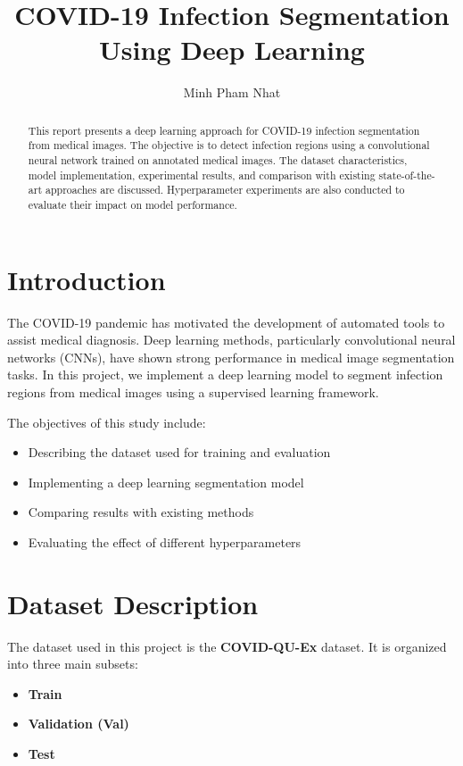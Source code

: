 \documentclass[10pt,twocolumn]{article}
\title{COVID-19 Infection Segmentation Using Deep Learning}
\author{Minh Pham Nhat}
\begin{document}
\maketitle

\begin{abstract}
This report presents a deep learning approach for COVID-19 infection segmentation from medical images. 
The objective is to detect infection regions using a convolutional neural network trained on annotated 
medical images. The dataset characteristics, model implementation, experimental results, and comparison 
with existing state-of-the-art approaches are discussed. Hyperparameter experiments are also conducted 
to evaluate their impact on model performance.
\end{abstract}

\section{Introduction}

The COVID-19 pandemic has motivated the development of automated tools to assist medical diagnosis. 
Deep learning methods, particularly convolutional neural networks (CNNs), have shown strong performance 
in medical image segmentation tasks. In this project, we implement a deep learning model to segment 
infection regions from medical images using a supervised learning framework.

The objectives of this study include:

\begin{itemize}
\item Describing the dataset used for training and evaluation
\item Implementing a deep learning segmentation model
\item Comparing results with existing methods
\item Evaluating the effect of different hyperparameters
\end{itemize}

\section{Dataset Description}

The dataset used in this project is the \textbf{COVID-QU-Ex} dataset. 
It is organized into three main subsets:

\begin{itemize}
\item \textbf{Train}
\item \textbf{Validation (Val)}
\item \textbf{Test}
\end{itemize}
\end{document}
